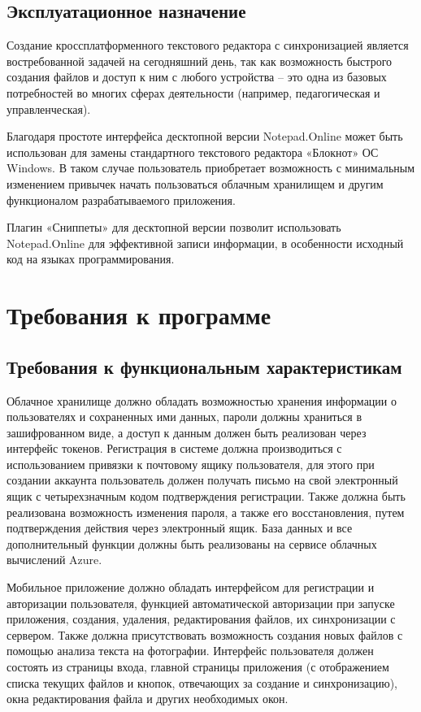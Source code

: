 ﻿\documentclass[techtask]{espd}
\begin{document}
\subsection{Эксплуатационное назначение}
Создание кроссплатформенного текстового редактора с синхронизацией является востребованной задачей на сегодняшний день, так как возможность быстрого создания файлов и доступ к ним с любого устройства – это одна из базовых потребностей во многих сферах деятельности (например, педагогическая и управленческая).

Благодаря простоте интерфейса десктопной версии Notepad.Online может быть использован для замены стандартного текстового редактора «Блокнот» ОС Windows. В таком случае пользователь приобретает возможность с минимальным изменением привычек начать пользоваться облачным хранилищем и другим функционалом разрабатываемого приложения.

Плагин «Сниппеты» для десктопной версии позволит использовать Notepad.Online для эффективной записи информации, в особенности исходный код на языках программирования.

\section{Требования к программе}

\subsection{Требования к функциональным характеристикам}
Облачное хранилище должно обладать возможностью хранения информации о пользователях и сохраненных ими данных, пароли должны храниться в зашифрованном виде, а доступ к данным должен быть реализован через интерфейс токенов. Регистрация в системе должна производиться с использованием привязки к почтовому ящику пользователя, для этого при создании аккаунта пользователь должен получать письмо на свой электронный ящик с четырехзначным кодом подтверждения регистрации. Также должна быть реализована возможность изменения пароля, а также его восстановления, путем подтверждения действия через электронный ящик. База данных и все дополнительный функции должны быть реализованы на сервисе облачных вычислений Azure.

Мобильное приложение должно обладать интерфейсом для регистрации и авторизации пользователя, функцией автоматической авторизации при запуске приложения, создания, удаления, редактирования файлов, их синхронизации с сервером. Также должна присутствовать возможность создания новых файлов с помощью анализа текста на фотографии. Интерфейс пользователя должен состоять из страницы входа, главной страницы приложения (с отображением списка текущих файлов и кнопок, отвечающих за создание и синхронизацию), окна редактирования файла и других необходимых окон.
\end{document}
